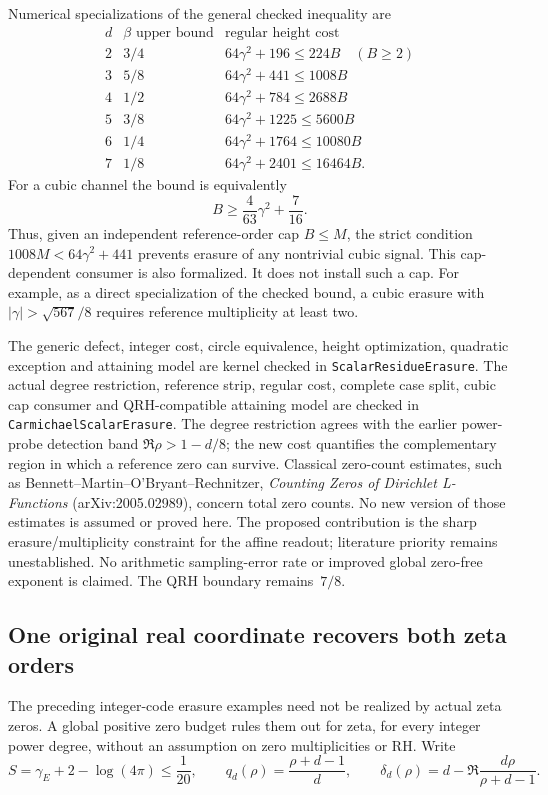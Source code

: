 Numerical specializations of the general checked inequality are
\[
\begin{array}{c|c|l}
 d&\beta\text{ upper bound}&\text{regular height cost}\\ \hline
 2&3/4&64\gamma^2+196\le224B\quad(B\ge2)\\
 3&5/8&64\gamma^2+441\le1008B\\
 4&1/2&64\gamma^2+784\le2688B\\
 5&3/8&64\gamma^2+1225\le5600B\\
 6&1/4&64\gamma^2+1764\le10080B\\
 7&1/8&64\gamma^2+2401\le16464B.
\end{array}
\]
For a cubic channel the bound is equivalently
\[
 B\ge\frac4{63}\gamma^2+\frac7{16}.
\]
Thus, given an independent reference-order cap \(B\le M\), the strict
condition \(1008M<64\gamma^2+441\) prevents erasure of any nontrivial cubic
signal. This cap-dependent consumer is also formalized. It does not install
such a cap. For example, as a direct specialization of the checked bound,
a cubic erasure with \( |\gamma|>\sqrt{567}/8\) requires reference multiplicity at
least two.

The generic defect, integer cost, circle equivalence, height optimization,
quadratic exception and attaining model are kernel checked in
\texttt{ScalarResidueErasure}. The actual degree restriction, reference
strip, regular cost, complete case split, cubic cap consumer and
QRH-compatible attaining model are checked in \texttt{CarmichaelScalarErasure}.
The degree restriction agrees with the earlier power-probe detection band
\(\Re\rho>1-d/8\); the new cost quantifies the complementary region in
which a reference zero can survive. Classical zero-count estimates, such
as Bennett--Martin--O'Bryant--Rechnitzer, \textit{Counting Zeros of Dirichlet
L-Functions} (arXiv:2005.02989), concern total zero counts. No new version of
those estimates is assumed or proved here. The proposed contribution is the
sharp erasure/multiplicity constraint for the affine readout; literature
priority remains unestablished. No arithmetic sampling-error rate or
improved global zero-free exponent is claimed. The QRH boundary remains~\(7/8\).

\subsection{One original real coordinate recovers both zeta orders}
\label{sec:single-real-zeta}

The preceding integer-code erasure examples need not be realized by actual
zeta zeros. A global positive zero budget rules them out for zeta, for every
integer power degree, without an assumption on zero multiplicities or RH.
Write
\[
 S=\gamma_E+2-\log(4\pi)\le\frac1{20},\qquad
 q_d(\rho)=\frac{\rho+d-1}{d},\qquad
 \delta_d(\rho)=d-\Re\frac{d\rho}{\rho+d-1}.
\]

